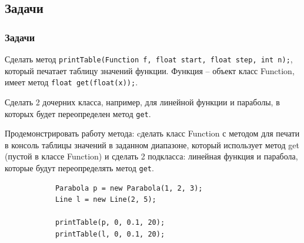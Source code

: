 \subsection{Задачи}
\begin{frame}[fragile]
	\frametitle{Задачи}
	\begin{small}
	\begin{enumerate}
	\parindent 5mm
		\begin{item}
		Сделать метод \texttt{printTable(Function f, float start, float step, int n);}, который печатает таблицу значений функции. Функция -- объект класс Function, имеет метод \texttt{float get(float(x));}.
		
		Сделать 2 дочерних класса, например, для линейной функции и параболы, в которых будет переопределен метод \texttt{get}.
		
		Продемонстрировать работу метода: cделать класс Function с методом для печати в консоль таблицы значений в заданном диапазоне, который использует метод get (пустой в классе Function) и сделать 2 подкласса: линейная функция и парабола, которые будут переопределять метод \texttt{get}.

		\begin{verbatim}
			Parabola p = new Parabola(1, 2, 3);
			Line l = new Line(2, 5);

			printTable(p, 0, 0.1, 20);
			printTable(l, 0, 0.1, 20);
		\end{verbatim}
		\end{item}
	\end{enumerate}
	\end{small}
\end{frame}

